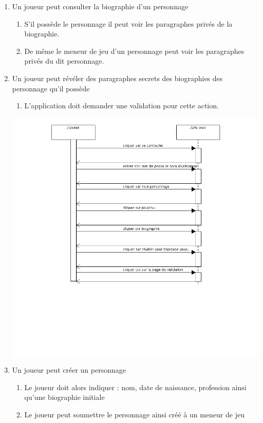 \documentclass[a4paper, 11pt, titlepage]{article}
\begin{document}
\begin{enumerate}
    \item Un joueur peut consulter la biographie d'un personnage 
        \begin{enumerate}
            \item  S'il possède le personnage il peut voir les paragraphes privés de la biographie.
            \item De même le meneur de jeu d'un personnage peut voir les paragraphes privés du dit personnage.
        \end{enumerate}
    \item Un joueur peut révéler des paragraphes secrets des biographies des personnage qu'il possède 
    \begin{enumerate}
        \item  L'application doit demander une validation pour cette action.            
    \end{enumerate}
        \includegraphics[scale=0.5]{sequence/RevelerParagAnalyse.png}
      \item Un joueur peut créer un personnage 
      \begin{enumerate}
        \item  Le joueur doit alors indiquer : nom, date de naissance, profession ainsi qu'une biographie initiale
        \item Le joueur peut soumettre le personnage ainsi créé à un meneur de jeu

\end{enumerate}
\end{enumerate}
\end{document}
